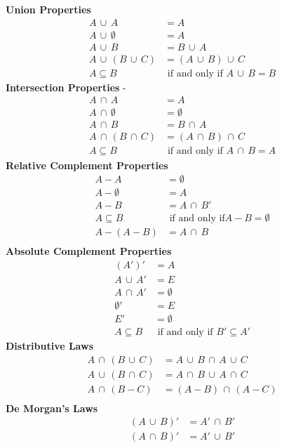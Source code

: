 \documentclass[12pt]{book}
\begin{document}
\noindent\textbf{Union Properties}
\begin{align*}
A\,\cup\, A & = A\\
A\,\cup\,\emptyset & = A\\
A\,\cup\, B & = B\,\cup\, A\\
A\,\cup\, (B\,\cup\, C) & = (A\,\cup\, B)\,\cup\, C\\
A\subseteq B & \text{ if and only if } A\,\cup\, B=B
\end{align*}
\textbf{Intersection Properties}
-\begin{align*}
A\,\cap\, A & = A\\
A\,\cap\,\emptyset & = \emptyset\\
A\,\cap\, B & = B\,\cap\, A\\
A\,\cap\, (B\,\cap\, C) & = (A\,\cap\, B)\,\cap\, C\\
A\subseteq B & \text{ if and only if } A\,\cap\, B=A
\end{align*}
\textbf{Relative Complement Properties}
\begin{align*}
A-A & = \emptyset\\
A-\emptyset & = A\\
A-B & = A\,\cap\, B'\\
A\subseteq B & \text{ if and only if} A-B=\emptyset\\
A-(A-B) & = A\,\cap\, B\\
\end{align*}
\textbf{Absolute Complement Properties}
\begin{align*}
(A')' & = A\\
A\,\cup\, A' & = E \\
A\,\cap\, A' & = \emptyset\\
\emptyset' & = E\\
E' & = \emptyset\\
A\subseteq B & \text{ if and only if } B'\subseteq A'
\end{align*}
\textbf{Distributive Laws}
\begin{align*}
A\,\cap\, (B\,\cup\, C) & = A\,\cup\, B\,\cap\, A\,\cup\, C\\
A\,\cup\, (B\,\cap\, C) & = A\,\cap\, B\,\cup\, A\,\cap\, C\\
A\,\cap\,(B - C) & = (A-B)\,\cap\, (A-C)\\
\end{align*}
\textbf{De Morgan's Laws}
\begin{align*}
(A\,\cup\, B)' & = A'\,\cap\, B'\\
(A\,\cap\, B)' & = A'\,\cup\, B'
\end{align*}
\end{document}
